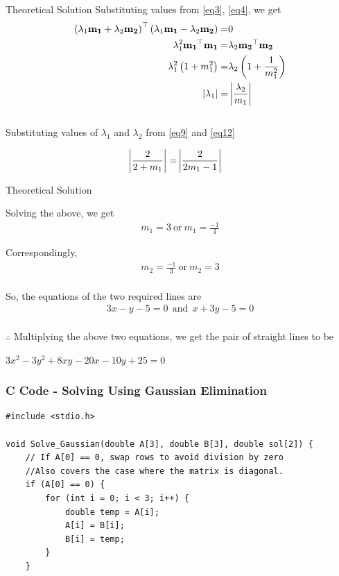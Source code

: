 \documentclass{beamer}
\begin{document}
\begin{frame}{Theoretical Solution}
    Substituting values from \eqref{eq3}, \eqref{eq4}, we get
\begin{align}
    \left(\lambda_1\mathbf{m_1}+\lambda_2\mathbf{m_2}\right)^\top\left(\lambda_1\mathbf{m_1}-\lambda_2\mathbf{m_2}\right) =& 0\\
    \lambda_1^2\mathbf{m_1}^\top\mathbf{m_1} =& \lambda_2\mathbf{m_2}^\top\mathbf{m_2}\\
    \lambda_1^2\left(1+m_1^2\right) =& \lambda_2\left(1+\frac{1}{m_1^2}\right)\\
    \left\vert\lambda_1\right\vert=& \left\vert\frac{\lambda_2}{m_1}\right\vert
\end{align}\\

Substituting values of $\lambda_1$ and $\lambda_2$ from \eqref{eq9} and \eqref{eq12}

\begin{align}
    \left\vert \frac{2}{2+m_1}\right\vert =& \left\vert\frac{2}{2m_1-1}\right\vert
\end{align}
\end{frame}

\begin{frame}{Theoretical Solution}

Solving the above, we get
\begin{align}
    m_1 = 3 \ \text{or} \ m_1 = \frac{-1}{3}
\end{align}

Correspondingly,
\begin{align}
    m_2 = \frac{-1}{3} \ \text{or} \ m_2 = 3
\end{align}\\

So, the equations of the two required lines are
\begin{align}
    3x-y-5=0 \ \ \text{and}\ \ x+3y-5=0
\end{align}\\

$\therefore$ Multiplying the above two equations, we get the pair of straight lines to be 
\begin{center}
   $3x^2 - 3y^2 + 8xy - 20x - 10y + 25 = 0$
\end{center} 
\end{frame}

\begin{frame}[fragile]
    \frametitle{C Code - Solving Using Gaussian Elimination}

    \begin{lstlisting}
#include <stdio.h>

void Solve_Gaussian(double A[3], double B[3], double sol[2]) {
    // If A[0] == 0, swap rows to avoid division by zero
    //Also covers the case where the matrix is diagonal.
    if (A[0] == 0) {
        for (int i = 0; i < 3; i++) {
            double temp = A[i];
            A[i] = B[i];
            B[i] = temp;
        }
    }

    \end{lstlisting}

\end{frame}
\end{document}
